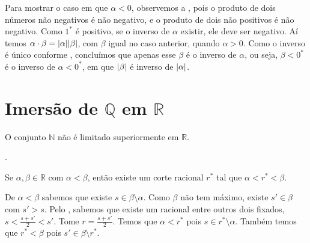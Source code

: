 \documentclass[../main.tex]{subfiles}
\begin{document}
\begin{dem}
    Para mostrar o caso em que $\alpha < 0$, observemos a , pois o produto de dois números não negativos é não negativo, e o produto de dois não positivos é não negativo. Como $1^*$ é positivo, se o inverso de $\alpha$ existir, ele deve ser negativo. Aí temos 
    $\alpha \cdot \beta = \abs{\alpha} \abs{\beta}$, com $\beta$ igual no caso anterior, quando $\alpha > 0$. Como o inverso é único conforme , concluímos que apenas esse $\beta$ é o inverso de $\alpha$, ou seja, $\beta < 0^*$ é o inverso de $\alpha < 0^*$, em que $\abs{\beta}$ é inverso de $\abs{\alpha}$.
    
\end{dem}


\section{Imersão de $\mathbb{Q}$ em $\mathbb{R}$}
\begin{teo}\label{reais-teo-ilimitadoSuperiormente}
    O conjunto $\mathbb{N}$ não é limitado superiormente em $\mathbb{R}$.
\end{teo}
\begin{dem}
    .
\end{dem}

\begin{prop}\label{reais-prop-entreDoisReaisHaUmTerceiro}
    Se $\alpha, \beta \in \mathbb{R}$ com $\alpha < \beta$, então existe um corte racional $r^*$ tal que $\alpha < r^* < \beta$.
\end{prop}
\begin{dem}
    De $\alpha < \beta$ sabemos que existe $s \in \beta \setminus \alpha$. Como $\beta$ não tem máximo, existe $s' \in \beta $ com $ s' > s$.
    Pelo , sabemos que existe um racional entre outros dois fixados, $s < \frac{s + s'}{2} < s'$. Tome $r = \frac{s+s'}{2}$. Temos que $\alpha < r^*$ pois $s \in r^* \setminus \alpha$. Também temos que $r^* < \beta$ pois $s' \in \beta \setminus r^*$. 
\end{dem}
\end{document}
